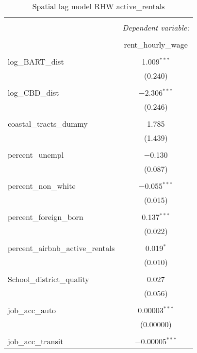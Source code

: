 \documentclass[10pt, letterpaper]{amsart}
\begin{document}
\begin{table}[H] \centering 
  \caption{Spatial lag model RHW active\_rentals} 
  \label{} 
  \begin{tabular}{@{\extracolsep{5pt}}lc} 
    \\[-1.8ex]\hline 
    \hline \\[-1.8ex] 
    & \multicolumn{1}{c}{\textit{Dependent variable:}} \\ 
    \cline{2-2} 
    \\[-1.8ex] & rent\_hourly\_wage \\ 
    \hline \\[-1.8ex] 
    log\_BART\_dist & 1.009$^{***}$ \\ 
    & (0.240) \\ 
    & \\ 
    log\_CBD\_dist & $-$2.306$^{***}$ \\ 
    & (0.246) \\ 
    & \\ 
    coastal\_tracts\_dummy & 1.785 \\ 
    & (1.439) \\ 
    & \\ 
    percent\_unempl & $-$0.130 \\ 
    & (0.087) \\ 
    & \\ 
    percent\_non\_white & $-$0.055$^{***}$ \\ 
    & (0.015) \\ 
    & \\ 
    percent\_foreign\_born & 0.137$^{***}$ \\ 
    & (0.022) \\ 
    & \\ 
    percent\_airbnb\_active\_rentals & 0.019$^{*}$ \\ 
    & (0.010) \\ 
    & \\ 
    School\_district\_quality & 0.027 \\ 
    & (0.056) \\ 
    & \\ 
    job\_acc\_auto & 0.00003$^{***}$ \\ 
    & (0.00000) \\ 
    & \\ 
    job\_acc\_transit & $-$0.00005$^{***}$ \\ 

\end{tabular}
\end{table}
\end{document}
